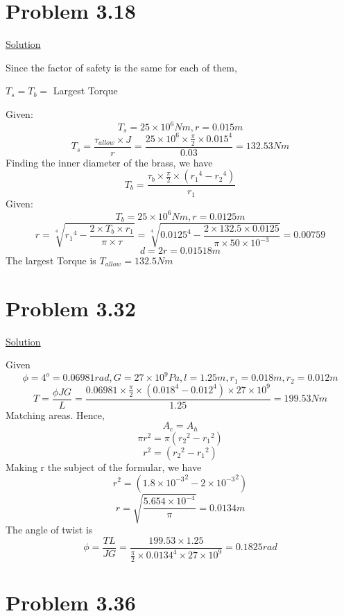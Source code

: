 \documentclass{article}
\begin{document}
\section*{Problem 3.18}


\begin{center}\underline{Solution}\end{center}
Since the factor of safety is the same for each of them, 
\begin{center}$T_{s} = T_{b} = $ Largest Torque\end{center}
Given: \[T_{s} = 25\times10^{6}Nm, r= 0.015m\]
\[T_{s} = \frac{\tau_{allow}\times J}{r} = \frac{25\times10^{6}\times\frac{\pi}{2}\times{0.015}^{4}}{0.03} = 132.53Nm\]
Finding the inner diameter of the brass, we have
\[T_{b} = \frac{\tau_{b}\times\frac{\pi}{2}\times({r_{1}}^{4}-{r_{2}}^{4})}{r_{1}} \]
Given:\[T_{b} = 25\times10^{6}Nm, r= 0.0125m\]
\[r = \sqrt[4]{{r_{1}}^{4} - \frac{2\times T_{b}\times r_{1}}{\pi\times\tau}}= \sqrt[4]{{0.0125}^{4} - \frac{2\times132.5\times 0.0125}{\pi\times50\times10^{-3}}} = 0.00759\]
\[d = 2r = 0.01518m\]
The largest Torque is $T_{allow} = 132.5Nm$

\section*{Problem 3.32}


\begin{center}\underline{Solution}\end{center}
Given \[\phi =4^{o} = 0.06981rad, G = 27\times10^{9}Pa, l = 1.25m, r_{1} = 0.018m, r_{2} = 0.012m\]
\[T = \frac{\phi J G}{L} = \frac{0.06981\times\frac{\pi}{2}\times(0.018^{4}-0.012^{4})\times27\times10^{9}}{1.25} = 199.53Nm\]
Matching areas. Hence, \[A_{c}=A_{h}\]
\[\pi r^{2} = \pi({r_{2}}^{2} - {r_{1}}^{2})\]
\[ r^{2} = ({r_{2}}^{2} - {r_{1}}^{2})\]
Making r the subject of the formular, we have
\[ r^{2} = {({1.8\times10^{-3}}^{2} - {2\times10^{-3}}^{2})}\]
\[r = \sqrt{\frac{5.654\times10^{-4}}{\pi}}=0.0134m\]
The angle of twist is 
\[\phi = \frac{TL}{JG} = \frac{199.53\times1.25}{\frac{\pi}{2}\times0.0134^{4}\times27\times10^{9}} = 0.1825rad\]



\section*{Problem 3.36}
\end{document}
